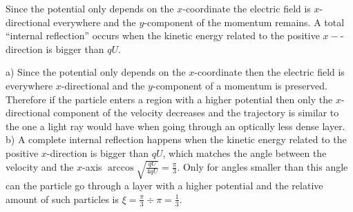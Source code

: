 {\ifEngHint
Since the potential only depends on the $x$-coordinate the electric field is $x$-directional everywhere and the $y$-component of the momentum remains. A total “internal reflection” occurs when the kinetic energy related to the positive $x-$-direction is bigger than $qU$.
\fi


\ifEngSolution
a) Since the potential only depends on the $x$-coordinate then the electric field is everywhere $x$-directional and the $y$-component of a momentum is preserved. Therefore if the particle enters a region with a higher potential then only the $x$-directional component of the velocity decreases and the trajectory is similar to the one a light ray would have when going through an optically less dense layer.\\
b) A complete internal reflection happens when the kinetic energy related to the positive $x$-direction is bigger than $qU$, which matches the angle between the velocity and the $x$-axis $\arccos \sqrt{\frac {qU}{4qU}}=\frac \pi 3$. Only for angles smaller than this angle can the particle go through a layer with a higher potential and the relative amount of such particles is $\xi = \frac \pi 3 \div \pi = \frac 13$.
\fi
}